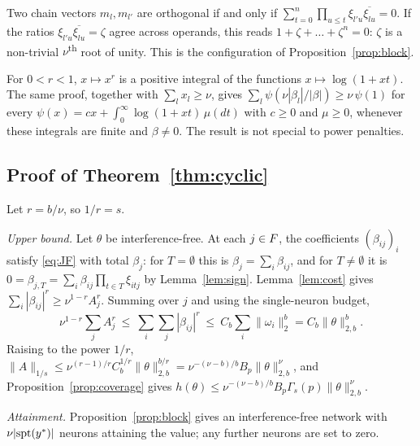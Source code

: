 \begin{remark}
Two chain vectors $m_l,m_{l'}$ are orthogonal if and only if $\sum_{t=0}^n\prod_{u\le t}\xi_{l'u}\overline{\xi_{lu}}=0$. If the ratios $\xi_{l'u}\overline{\xi_{lu}}=\zeta$ agree across operands, this reads $1+\zeta+\dots+\zeta^n=0$: $\zeta$ is a non-trivial $\nu$\textsuperscript{th} root of unity. This is the configuration of Proposition~\ref{prop:block}.
\end{remark}

\begin{remark}
For $0<r<1$, $x\mapsto x^r$ is a positive integral of the functions $x\mapsto\log(1+xt)$. The same proof, together with $\sum_lx_l\ge\nu$, gives $\sum_l\psi(\nu|\beta_l|/|\beta|)\ge\nu\,\psi(1)$ for every $\psi(x)=cx+\int_0^\infty\log(1+xt)\,\mu(dt)$ with $c\ge0$ and $\mu\ge0$, whenever these integrals are finite and $\beta\neq0$. The result is not special to power penalties.
\end{remark}

\subsection{Proof of Theorem~\ref{thm:cyclic}}\label{app:thm}

Let $r=b/\nu$, so $1/r=s$.

\emph{Upper bound.} Let $\theta$ be interference-free. At each $j\in F$, the coefficients $(\beta_{ij})_i$ satisfy \eqref{eq:JF} with total $\beta_j$: for $T=\emptyset$ this is $\beta_j=\sum_i\beta_{ij}$, and for $T\neq\emptyset$ it is $0=\beta_{j,T}=\sum_i\beta_{ij}\prod_{t\in T}\xi_{itj}$ by Lemma~\ref{lem:sign}. Lemma~\ref{lem:cost} gives $\sum_i|\beta_{ij}|^r\ge\nu^{1-r}A_j^r$. Summing over $j$ and using the single-neuron budget,
\begin{equation}
\nu^{1-r}\sum_jA_j^r\ \le\ \sum_i\sum_j|\beta_{ij}|^r\ \le\ C_b\sum_i\|\omega_i\|_2^b=C_b\|\theta\|_{2,b}^b .
\label{eq:chain}
\end{equation}
Raising to the power $1/r$, $\|A\|_{1/s}\le\nu^{(r-1)/r}C_b^{1/r}\|\theta\|_{2,b}^{b/r}=\nu^{-(\nu-b)/b}B_p\|\theta\|_{2,b}^{\nu}$, and Proposition~\ref{prop:coverage} gives $h(\theta)\le\nu^{-(\nu-b)/b}B_p\Gamma_s(p)\|\theta\|_{2,b}^\nu$.

\emph{Attainment.} Proposition~\ref{prop:block} gives an interference-free network with $\nu|\mathrm{spt}(y^*)|$ neurons attaining the value; any further neurons are set to zero.

